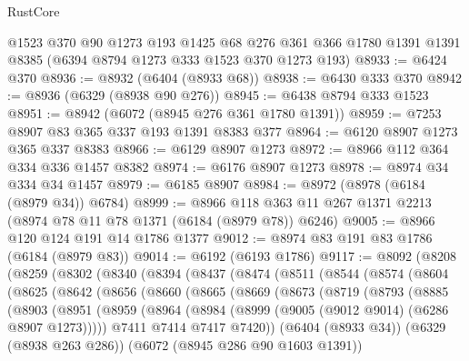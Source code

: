 \begin{lexlean}{RustCore}
\begin{coremodule}
{\begin{coremodule}
{{{{{{{{{{{{{{{{{{{{{{{{{{{{{{{{{{{{{{{{{{{{    @1523
    @370
    @90
    @1273
    @193
    @1425
    @68
    @276
    @361
    @366
    @1780
    @1391
    @1391
    @8385
    (@6394 @8794 @1273 @333 @1523 @370 @1273 @193)
@8933 := @6424 @370
@8936 := @8932 (@6404 (@8933 @68))
@8938 := @6430 @333 @370
@8942 := @8936 (@6329 (@8938 @90 @276))
@8945 := @6438 @8794 @333 @1523
@8951 := @8942 (@6072 (@8945 @276 @361 @1780 @1391))
@8959 := @7253 @8907 @83 @365 @337 @193 @1391 @8383 @377
@8964 := @6120 @8907 @1273 @365 @337 @8383
@8966 := @6129 @8907 @1273
@8972 := @8966 @112 @364 @334 @336 @1457 @8382
@8974 := @6176 @8907 @1273
@8978 := @8974 @34 @334 @34 @1457
@8979 := @6185 @8907
@8984 := @8972 (@8978 (@6184 (@8979 @34)) @6784)
@8999 := @8966 @118 @363 @11 @267 @1371 @2213 (@8974 @78 @11 @78 @1371 (@6184 (@8979 @78)) @6246)
@9005 := @8966 @120 @124 @191 @14 @1786 @1377
@9012 := @8974 @83 @191 @83 @1786 (@6184 (@8979 @83))
@9014 := @6192 (@6193 @1786)
@9117 := @8092
    (@8208
      (@8259
        (@8302
          (@8340
            (@8394
              (@8437
                (@8474
                  (@8511
                    (@8544
                      (@8574
                        (@8604
                          (@8625
                            (@8642
                              (@8656
                                (@8660
                                  (@8665
                                    (@8669
                                      (@8673
                                        (@8719
                                          (@8793
                                            (@8885
                                              (@8903
                                                (@8951
                                                  (@8959
                                                    (@8964
                                                      (@8984
                                                        (@8999
                                                          (@9005
                                                            (@9012 @9014)
                                                            (@6286 @8907 @1273)))))
                                                    @7411
                                                    @7414
                                                    @7417
                                                    @7420))
                                                (@6404 (@8933 @34))
                                                (@6329 (@8938 @263 @286))
                                                (@6072 (@8945 @286 @90 @1603 @1391))
}}}}}}}}}}}}}}}}}}}}}}}}}}}}}}}}}}}}}}}}}}}}
\end{coremodule}}
\end{coremodule}
\end{lexlean}
